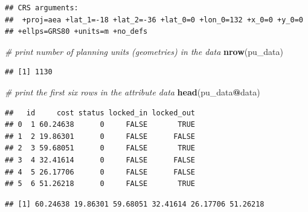 \documentclass[12pt,]{book}
\newenvironment{Shaded}{\begin{snugshade}}{\end{snugshade}}
\newcommand{\KeywordTok}[1]{\textcolor[rgb]{0.13,0.29,0.53}{\textbf{#1}}}
\newcommand{\CommentTok}[1]{\textcolor[rgb]{0.56,0.35,0.01}{\textit{#1}}}
\newcommand{\OperatorTok}[1]{\textcolor[rgb]{0.81,0.36,0.00}{\textbf{#1}}}
\newcommand{\NormalTok}[1]{#1}
\begin{document}
\begin{verbatim}
## CRS arguments:
##  +proj=aea +lat_1=-18 +lat_2=-36 +lat_0=0 +lon_0=132 +x_0=0 +y_0=0
## +ellps=GRS80 +units=m +no_defs
\end{verbatim}

\begin{Shaded}
\begin{Highlighting}[]
\CommentTok{# print number of planning units (geometries) in the data}
\KeywordTok{nrow}\NormalTok{(pu_data)}
\end{Highlighting}
\end{Shaded}

\begin{verbatim}
## [1] 1130
\end{verbatim}

\begin{Shaded}
\begin{Highlighting}[]
\CommentTok{# print the first six rows in the attribute data}
\KeywordTok{head}\NormalTok{(pu_data}\OperatorTok{@}\NormalTok{data)}
\end{Highlighting}
\end{Shaded}

\begin{verbatim}
##   id     cost status locked_in locked_out
## 0  1 60.24638      0     FALSE       TRUE
## 1  2 19.86301      0     FALSE      FALSE
## 2  3 59.68051      0     FALSE       TRUE
## 3  4 32.41614      0     FALSE      FALSE
## 4  5 26.17706      0     FALSE      FALSE
## 5  6 51.26218      0     FALSE       TRUE
\end{verbatim}

\begin{Shaded}
\end{Shaded}

\begin{verbatim}
## [1] 60.24638 19.86301 59.68051 32.41614 26.17706 51.26218
\end{verbatim}

\begin{Shaded}
\end{Shaded}
\end{document}
